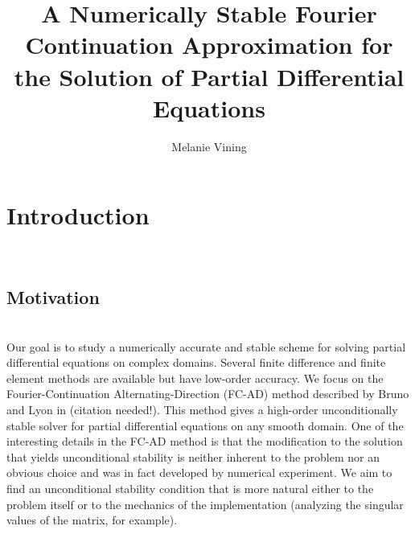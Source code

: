 \documentclass[11pt]{amsart}
\title{A Numerically Stable Fourier Continuation Approximation for the Solution of Partial Differential Equations}
\author{Melanie Vining}
\begin{document}
\maketitle
\section{Introduction} \\
\subsection{Motivation} \\
Our goal is to study a numerically accurate and stable scheme for solving partial differential equations on complex domains.  Several finite difference and finite element methods are available but have low-order accuracy.  We focus on the Fourier-Continuation Alternating-Direction (FC-AD)  method described by Bruno and Lyon in (citation needed!). This method gives a high-order unconditionally stable solver for partial differential equations on any smooth domain.  One of the interesting details in the FC-AD method is that the modification to the solution that yields unconditional stability is neither inherent to the problem nor an obvious choice and was in fact developed by numerical experiment.  We aim to find an unconditional stability condition that is more natural either to the problem itself or to the mechanics of the implementation (analyzing the singular values of the matrix, for example).  
\end{document}
